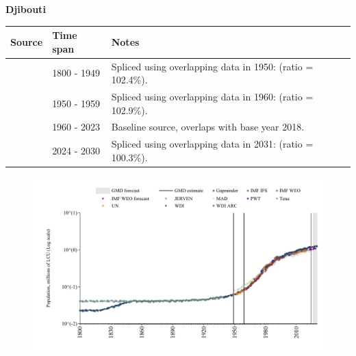 \documentclass[12pt,a4paper,landscape]{article}
\begin{document}
\begin{adjustbox}{max totalsize={\paperwidth}{\paperheight},center}
\begin{minipage}[t][\textheight][t]{\textwidth}
\vspace*{0.5cm}
{}
\begin{center}
{\Large\bfseries Djibouti}
\end{center}
\vspace{0.5cm}
\begin{table}[H]
\centering
\small
\begin{tabular}{|l|l|l|}
\hline
\textbf{Source} & \textbf{Time span} & \textbf{Notes} \\
\hline
\rowcolor{white}\cite{Gapminder}& 1800 - 1949 &Spliced using overlapping data in 1950: (ratio = 102.4\%).\\
\rowcolor{lightgray}\cite{IMF_IFS}& 1950 - 1959 &Spliced using overlapping data in 1960: (ratio = 102.9\%).\\
\rowcolor{white}\cite{WDI}& 1960 - 2023 &Baseline source, overlaps with base year 2018.\\
\rowcolor{lightgray}\cite{Gapminder}& 2024 - 2030 &Spliced using overlapping data in 2031: (ratio = 100.3\%).\\
\hline
\end{tabular}
\end{table}
\begin{figure}[H]
\centering
\includegraphics[width=\textwidth,height=0.6\textheight,keepaspectratio]{graphs/DJI_pop.pdf}
\end{figure}
\end{minipage}
\end{adjustbox}
\end{document}
